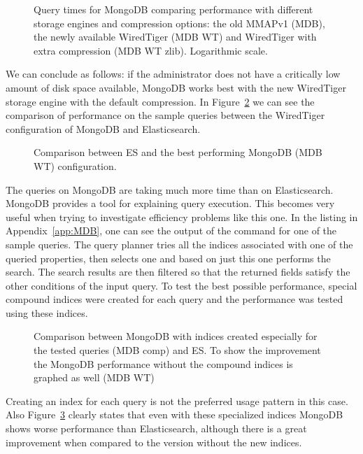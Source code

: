 \begin{figure}[h]
	\centering
	
	\caption{Query times for MongoDB comparing performance with different storage engines and compression 
	options: the old MMAPv1 (MDB), the newly available WiredTiger (MDB WT) and WiredTiger with extra compression 
	(MDB WT zlib). Logarithmic scale.}
	\label{fig:MDBcomparison}
\end{figure}

We can conclude as follows: if the administrator does not have a critically low amount of disk space available, MongoDB
works best with the new WiredTiger storage engine with the default compression. In Figure~\ref{fig:DBscomparison} we 
can see the comparison of performance on the sample queries between the WiredTiger configuration of MongoDB and 
Elasticsearch. 

\begin{figure}[h]
	\centering
	
	\caption{Comparison between ES and the best performing MongoDB (MDB WT) configuration.}
	\label{fig:DBscomparison}
\end{figure}

The queries on MongoDB are taking much more time than on Elasticsearch. MongoDB provides
a tool for explaining query execution. This becomes very useful when trying to investigate efficiency problems
like this one. In the listing in Appendix~\ref{app:MDB}, one can see the output of the command for one of the 
sample queries. The query planner tries all the indices associated with one of the queried properties, then 
selects one and based on just this one performs the search. The search results are then filtered so that the 
returned 
fields satisfy the other conditions of the input query. To test the best possible performance, special compound 
indices were created for each query and the performance was tested using these indices. 

\begin{figure}[h]
	\centering
	
	\caption{Comparison between MongoDB with indices created especially for the tested queries (MDB comp) and 
	ES. To show the improvement the MongoDB performance without the compound indices is graphed as well
	(MDB WT)}
	\label{fig:MDBcompound}
\end{figure}

Creating an index for each query is not the preferred usage pattern in this case. Also Figure~\ref{fig:MDBcompound} 
clearly states that even with these specialized indices MongoDB shows worse performance 
than Elasticsearch, although there is a great improvement when compared to the version without the new indices.  

